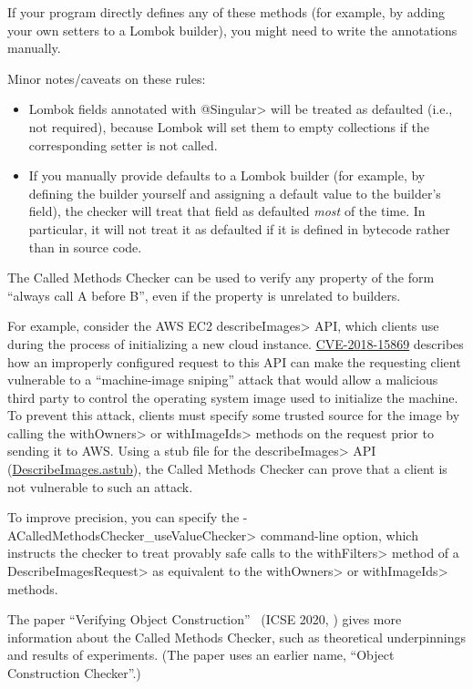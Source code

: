 If your program directly defines any of these methods (for example, by adding your own setters to
a Lombok builder), you might need to write the annotations manually.

Minor notes/caveats on these rules:
\begin{itemize}
\item Lombok fields annotated with \<@Singular> will be treated as defaulted (i.e., not required), because
Lombok will set them to empty collections if the corresponding setter is not called.
\item If you manually provide defaults to a Lombok builder (for example, by defining the builder yourself
and assigning a default value to the builder's field), the checker will treat that field as defaulted
\emph{most} of the time. In particular, it will not treat it as defaulted if it is defined in bytecode rather
than in source code.
\end{itemize}



The Called Methods Checker can be used to verify any property of the form
``always call A before B'', even if the property is unrelated to builders.

For example, consider the AWS EC2 \<describeImages> API, which
clients use during the process of initializing a new cloud instance.
\href{https://www.cve.org/CVERecord?id=CVE-2018-15869}{CVE-2018-15869}
describes how an improperly configured request to this API can make the
requesting client vulnerable to a ``machine-image sniping'' attack that
would allow a malicious third party to control the operating system image
used to initialize the machine. To prevent this attack, clients must
specify some trusted source for the image by calling the \<withOwners> or
\<withImageIds> methods on the request prior to sending it to AWS\@. Using
a stub file for the \<describeImages> API
(\href{https://github.com/typetools/checker-framework/blob/master/checker/src/main/java/org/checkerframework/checker/calledmethods/DescribeImages.astub}{DescribeImages.astub}),
the Called Methods Checker can prove that a client is not vulnerable to
such an attack.

To improve precision, you can specify the
\<-ACalledMethodsChecker\_useValueChecker> command-line option, which
instructs the checker to treat provably safe calls to the \<withFilters>
method of a \<DescribeImagesRequest> as equivalent to the \<withOwners> or
\<withImageIds> methods.



The paper ``Verifying Object Construction''~\cite{KelloggRSSE2020} (ICSE 2020,
)
gives more information about the Called Methods Checker, such as
theoretical underpinnings and results of experiments.  (The paper uses an
earlier name, ``Object Construction Checker''.)
